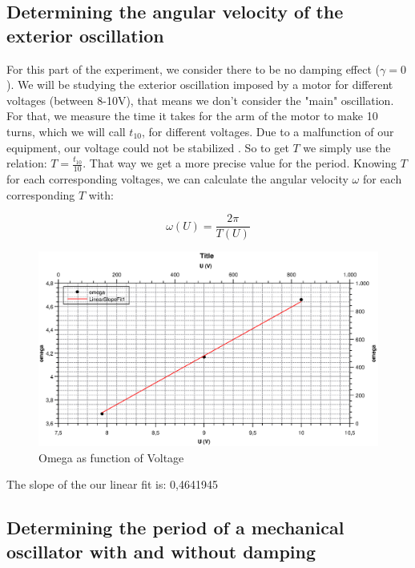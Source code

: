 \documentclass{scrartcl}
\begin{document}
\subsection{Determining the angular velocity of the exterior oscillation} 

For this part of the experiment, we consider there to be no damping effect ($\gamma = 0$). We will be studying the exterior oscillation imposed by a motor for different voltages (between 8-10V), that means we don't consider the "main" oscillation. For that, we measure the time it takes for the arm of the motor to make 10 turns, which we will call $t_{10}$, for different voltages. Due to a malfunction of our equipment, our voltage could not be stabilized . So to get $T$ we simply use the relation: $T=\frac{t_{10}}{10}$. That way we get a more precise value for the period.
Knowing $T$ for each corresponding voltages, we can calculate the angular velocity $\omega$ for each corresponding $T$ with:

\begin{equation}
    \omega(U)=\frac{2\pi}{T(U)}
\end{equation}

\begin{figure}[h]
    \centering
    \includegraphics[width = 12cm]{SLopeOsci.eps}
    \caption{Omega as function of Voltage}
    \label{fig:my_label}
\end{figure}

The slope of the our linear fit is: 0,4641945

\subsection{Determining the period of a mechanical oscillator with and without damping}
\end{document}
